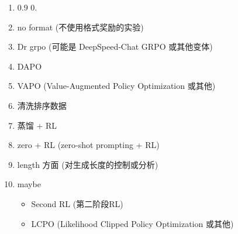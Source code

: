 \documentclass{pkuthesis}
\begin{document}
\begin{enumerate}[label=\arabic*.]
\begin{enumerate}[label=\arabic*.]
        \item 0.9 0.
        \item no format (不使用格式奖励的实验)
        \item Dr grpo (可能是 DeepSpeed-Chat GRPO 或其他变体)
        \item DAPO
        \item VAPO (Value-Augmented Policy Optimization 或其他)
        \item 清洗排序数据
        \item 蒸馏 + RL
        \item zero + RL (zero-shot prompting + RL)
        \item length 方面 (对生成长度的控制或分析)
        \item maybe
        \begin{itemize}
            \item Second RL (第二阶段RL)
            \item LCPO (Likelihood Clipped Policy Optimization 或其他)
        \end{itemize}
    \end{enumerate}
\end{enumerate}

\printbibliography
\end{document}

